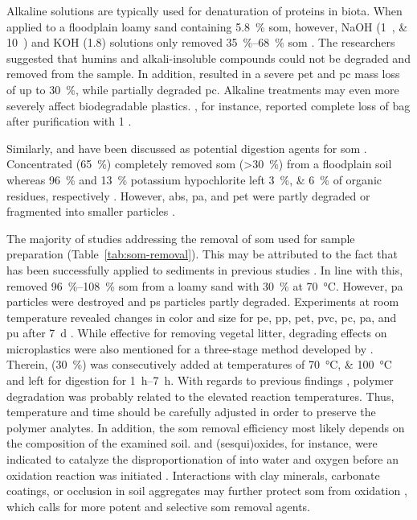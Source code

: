 Alkaline solutions are typically used for denaturation of proteins in biota. When applied to a floodplain loamy sand containing \SI{5.8}{\percent} \ac{som}, however, NaOH (\SIlist{1;10}{\Molar}) and KOH (\SI{1.8}{\Molar}) solutions only removed \SIrange{35}{68}{\percent} \ac{som} \citep{HurleyValidation2018}. The researchers suggested that humins and alkali-insoluble compounds could not be degraded and removed from the sample. In addition,  resulted in a severe \ac{pet} and \ac{pc} mass loss of up to \SI{30}{\percent}, while  partially degraded \ac{pc}. Alkaline treatments may even more severely affect biodegradable plastics. , for instance, reported complete loss of  bag after purification with \SI{1}{\Molar} .

Similarly,  and  have been discussed as potential digestion agents for \ac{som} \citep{BlasingPlastics2018}. Concentrated  (\SI{65}{\percent}) completely removed \ac{som} (\SI{>30}{\percent}) from a floodplain soil whereas \SI{96}{\percent}  and \SI{13}{\percent} potassium hypochlorite left \SIlist{3;6}{\percent} of organic residues, respectively \citep{ScheurerMicroplastics2018}. However, \ac{abs}, \ac{pa}, and \ac{pet} were partly degraded or fragmented into smaller particles \citep{ScheurerMicroplastics2018}.

The majority of studies addressing the removal of \ac{som} used  for sample preparation (Table~\ref{tab:som-removal}). This may be attributed to the fact that  has been successfully applied to sediments in previous studies \citep{NuelleNew2014,ImhofNovel2012}. In line with this, \citet{HurleyValidation2018} removed \SIrange{96}{108}{\percent} \ac{som} from a loamy sand with \SI{30}{\percent}  at \SI{70}{\degreeCelsius}. However, \ac{pa} particles were destroyed and \ac{ps} particles partly degraded.
Experiments at room temperature revealed changes in color and size for \ac{pe}, \ac{pp}, \ac{pet}, \ac{pvc}, \ac{pc}, \ac{pa}, and \ac{pu} after \SI{7}{\day} \citep{NuelleNew2014}. While effective for removing vegetal litter, degrading effects on microplastics were also mentioned for a three-stage method developed by \citet{DuanDevelopment2020}.
Therein,  (\SI{30}{\percent}) was consecutively added at temperatures of \SIlist{70;100}{\degreeCelsius} and left for digestion for \SIrange{1}{7}{\hour}. With regards to previous findings \citep{HurleyValidation2018}, polymer degradation was probably related to the elevated reaction temperatures. Thus, temperature and time should be carefully adjusted in order to preserve the polymer analytes. In addition, the \ac{som} removal efficiency most likely depends on the composition of the examined soil.  and  (sesqui)oxides, for instance, were indicated to catalyze the disproportionation of  into water and oxygen before an oxidation reaction was initiated \citep{PetigaraMechanisms2002}. Interactions with clay minerals, carbonate coatings, or occlusion in soil aggregates may further protect \ac{som} from oxidation \citep{MikuttaOrganic2005}, which calls for more potent and selective \ac{som} removal agents.


